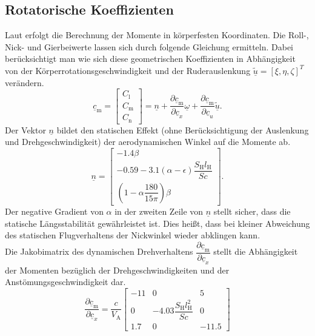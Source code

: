 \subsection{Rotatorische Koeffizienten}
Laut \cite{RAMYoutube_Playlist,RAMPaper} erfolgt die Berechnung der Momente in körperfesten Koordinaten. Die Roll-, Nick- und Gierbeiwerte lassen sich durch folgende Gleichung ermitteln. Dabei berücksichtigt man wie sich diese geometrischen Koeffizienten in Abhängigkeit von der Körperrotationsgeschwindigkeit und der Ruderauslenkung $\tilde{\underline{u}} = [\xi,\eta,
\zeta]^T$ verändern.
\begin{equation}
\underline{c}_\mathrm{m}  = \begin{bmatrix} 
C_\mathrm{l}\\
C_\mathrm{m}\\
C_\mathrm{n}
\end{bmatrix}=\underline{n} + \dfrac{\partial  \underline{c}_\mathrm{m}}{\partial  \underline{c}_x} \underline{\omega} + \dfrac{\partial  \underline{c}_\mathrm{m}}{\partial  \underline{c}_u} \tilde{\underline{u}}.
\end{equation}
Der Vektor $\underline{n}$ bildet den statischen Effekt (ohne Berücksichtigung der Auslenkung und Drehgeschwindigkeit) der aerodynamischen Winkel auf die Momente ab. 
\begin{equation}
\underline{n} = \begin{bmatrix} 
-1.4\beta \\
-0.59 -3.1(\alpha-\epsilon)\dfrac{S_\mathrm{H}l_\mathrm{H}}{Sc} \\
(1 - \alpha\dfrac{180}{15\pi})\beta
\end{bmatrix}.
\end{equation}
Der negative Gradient von $\alpha$ in der zweiten Zeile von $\underline{n}$ stellt sicher, dass die statische Längsstabilität gewährleistet ist. Dies hei{\ss}t, dass bei kleiner Abweichung des statischen Flugverhaltens der Nickwinkel wieder abklingen kann.\\
Die Jakobimatrix des dynamischen Drehverhaltens $\dfrac{\partial  \underline{c}_\mathrm{m}}{\partial  \underline{c}_x}$ stellt die Abhängigkeit der Momenten bezüglich der Drehgeschwindigkeiten und der Anstömungsgeschwindigkeit dar.
\begin{equation}
\dfrac{\partial  \underline{c}_\mathrm{m}}{\partial  \underline{c}_x} = \dfrac{c}{V_\mathrm{A}}\begin{bmatrix} 
-11 & 0 & 5 \\
0 &-4.03\dfrac{S_\mathrm{H}l_\mathrm{H}^2}{Sc}&0 \\
1.7 & 0 & -11.5
\end{bmatrix}
\end{equation}
